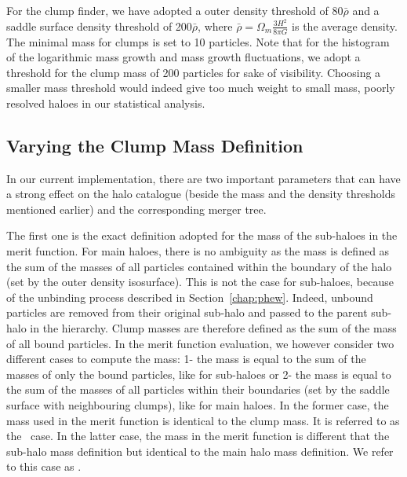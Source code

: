 For the clump finder, we have adopted a outer density
threshold of 80$\bar\rho$ and a saddle surface density threshold of
200$\bar\rho$, where $\bar\rho = \Omega_m \frac{3 H^2}{8 \pi G}$ is
the average density.  The minimal mass for clumps is set to 10
particles. Note that for the histogram of the logarithmic mass growth
and mass growth fluctuations, we adopt a threshold for the clump mass
of 200 particles for sake of visibility. Choosing a smaller mass
threshold would indeed give too much weight to small mass, poorly
resolved haloes in our statistical analysis.




\subsection{Varying the Clump Mass Definition}\label{chap:varying_clump_mass_definition}

In our current implementation, there are two important parameters that
can have a strong effect on the halo catalogue (beside the mass and
the density thresholds mentioned earlier) and the corresponding merger
tree.

The first one is the exact definition adopted for the mass of the
sub-haloes in the merit function.  For main haloes, there is no
ambiguity as the mass is defined as the sum of the masses of all
particles contained within the boundary of the halo (set by the outer
density isosurface). This is not the case for sub-haloes, because of the
unbinding process described in Section~\ref{chap:phew}. Indeed,
unbound particles are removed from their original sub-halo and passed
to the parent sub-halo in the hierarchy.  Clump masses are therefore
defined as the sum of the mass of all bound particles.  In the merit
function evaluation, we however consider two different cases to
compute the mass: 1- the mass is equal to the sum of the masses of
only the bound particles, like for sub-haloes or 2- the mass is equal
to the sum of the masses of all particles within their boundaries (set
by the saddle surface with neighbouring clumps), like for main haloes.
In the former case, the mass used in the merit function is identical
to the clump mass. It is referred to as the \exc\ case.  In the latter
case, the mass in the merit function is different that the sub-halo
mass definition but identical to the main halo mass definition.  We
refer to this case as \inc.

